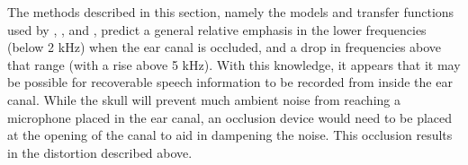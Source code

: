 




The methods described in this section, namely the models and transfer functions used by \cite{hansen:97b}, \cite{stenfelt:07}, and \cite{reinfeldt:10}, predict a general relative emphasis in the lower frequencies (below 2 kHz) when the ear canal is occluded, and a drop in frequencies above that range (with a rise above 5 kHz).  With this knowledge, it appears that it may be possible for recoverable speech information to be recorded from inside the ear canal.  While the skull will prevent much ambient noise from reaching a microphone placed in the ear canal, an occlusion device would need to be placed at the opening of the canal to aid in dampening the noise.  This occlusion results in the distortion described above.

